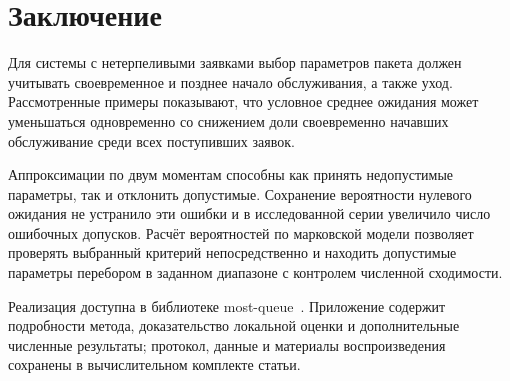 \section*{Заключение}

Для системы с нетерпеливыми заявками выбор параметров пакета должен учитывать своевременное и позднее начало обслуживания, а также уход. Рассмотренные примеры показывают, что условное среднее ожидания может уменьшаться одновременно со снижением доли своевременно начавших обслуживание среди всех поступивших заявок.

Аппроксимации по двум моментам способны как принять недопустимые параметры, так и отклонить допустимые. Сохранение вероятности нулевого ожидания не устранило эти ошибки и в исследованной серии увеличило число ошибочных допусков. Расчёт вероятностей по марковской модели позволяет проверять выбранный критерий непосредственно и находить допустимые параметры перебором в заданном диапазоне с контролем численной сходимости.

Реализация доступна в библиотеке most-queue~\cite{mostqueue2026}. Приложение содержит подробности метода, доказательство локальной оценки и дополнительные численные результаты; протокол, данные и материалы воспроизведения сохранены в вычислительном комплекте статьи.
